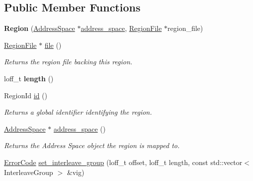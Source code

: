 \subsection*{Public Member Functions}
\begin{DoxyCompactItemize}
\item 
{\bfseries Region} (\hyperlink{classalps_1_1AddressSpace}{Address\+Space} $\ast$\hyperlink{classalps_1_1Region_a0468534d0b84744f4ae689afb13ae0b5}{address\+\_\+space}, \hyperlink{classalps_1_1RegionFile}{Region\+File} $\ast$region\+\_\+file)\hypertarget{classalps_1_1Region_a49be6b716e4cd1ac246c51c975511438}{}\label{classalps_1_1Region_a49be6b716e4cd1ac246c51c975511438}

\item 
\hyperlink{classalps_1_1RegionFile}{Region\+File} $\ast$ \hyperlink{classalps_1_1Region_ace503ff06288ae02cae4f9b2b7b391d8}{file} ()\hypertarget{classalps_1_1Region_ace503ff06288ae02cae4f9b2b7b391d8}{}\label{classalps_1_1Region_ace503ff06288ae02cae4f9b2b7b391d8}

\begin{DoxyCompactList}\small\item\em Returns the region file backing this region. \end{DoxyCompactList}\item 
loff\+\_\+t {\bfseries length} ()\hypertarget{classalps_1_1Region_affad93da622e09a41e9c5a78cf724fac}{}\label{classalps_1_1Region_affad93da622e09a41e9c5a78cf724fac}

\item 
Region\+Id \hyperlink{classalps_1_1Region_a44af36c129f944a859a1ef45bd1ddf74}{id} ()\hypertarget{classalps_1_1Region_a44af36c129f944a859a1ef45bd1ddf74}{}\label{classalps_1_1Region_a44af36c129f944a859a1ef45bd1ddf74}

\begin{DoxyCompactList}\small\item\em Returns a global identifier identifying the region. \end{DoxyCompactList}\item 
\hyperlink{classalps_1_1AddressSpace}{Address\+Space} $\ast$ \hyperlink{classalps_1_1Region_a0468534d0b84744f4ae689afb13ae0b5}{address\+\_\+space} ()\hypertarget{classalps_1_1Region_a0468534d0b84744f4ae689afb13ae0b5}{}\label{classalps_1_1Region_a0468534d0b84744f4ae689afb13ae0b5}

\begin{DoxyCompactList}\small\item\em Returns the Address Space object the region is mapped to. \end{DoxyCompactList}\item 
\hyperlink{group__ERRORCODES_ga6263a3c9a0b8d36aea21cdd835ac99fe}{Error\+Code} \hyperlink{classalps_1_1Region_a61ad82fe33c08b158c0ec5dec9403f8c}{set\+\_\+interleave\+\_\+group} (loff\+\_\+t offset, loff\+\_\+t length, const std\+::vector$<$ Interleave\+Group $>$ \&vig)\hypertarget{classalps_1_1Region_a61ad82fe33c08b158c0ec5dec9403f8c}{}\label{classalps_1_1Region_a61ad82fe33c08b158c0ec5dec9403f8c}


\end{DoxyCompactItemize}
